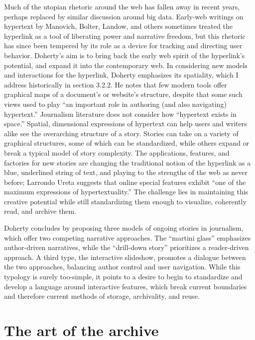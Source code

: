 Much of the utopian rhetoric around the web has fallen away in recent years, perhaps replaced by similar discussion around big data. Early-web writings on hypertext by Manovich, Bolter, Landow, and others sometimes treated the hyperlink as a tool of liberating power and narrative freedom, but this rhetoric has since been tempered by its role as a device for tracking and directing user behavior. Doherty's aim is to bring back the early web spirit of the hyperlink's potential, and expand it into the contemporary web. In considering new models and interactions for the hyperlink, Doherty emphasizes its spatiality, which I address historically in section 3.2.2. He notes that few modern tools offer graphical maps of a document's or website's structure, despite that some such views used to play ``an important role in authoring (and also navigating) hypertext.''\autocite{doherty_hypertext_2013} Journalism literature does not consider how ``hypertext exists in space.''\autocite{doherty_hypertext_2013} Spatial, dimensional expressions of hypertext can help users and writers alike see the overarching structure of a story. Stories can take on a variety of graphical structures, some of which can be standardized, while others expand or break a typical model of story complexity. The applications, features, and factories for new stories are changing the traditional notion of the hyperlink as a blue, underlined string of text, and playing to the strengths of the web as never before; Larrondo Ureta suggests that online special features exhibit ``one of the maximum expressions of hypertextuality.''\autocite{doherty_hypertext_2014,ureta_potential_2011} The challenge lies in maintaining this creative potential while still standardizing them enough to visualize, coherently read, and archive them.

Doherty concludes by proposing three models of ongoing stories in journalism, which offer two competing narrative approaches. The ``martini glass'' emphasizes author-driven narratives, while the ``drill-down story'' prioritizes a reader-driven approach. A third type, the interactive slideshow, promotes a dialogue between the two approaches, balancing author control and user navigation. While this typology is surely too-simple, it points to a desire to begin to standardize and develop a language around interactive features, which break current boundaries and therefore current methods of storage, archivality, and reuse.

\section{The art of the archive}

